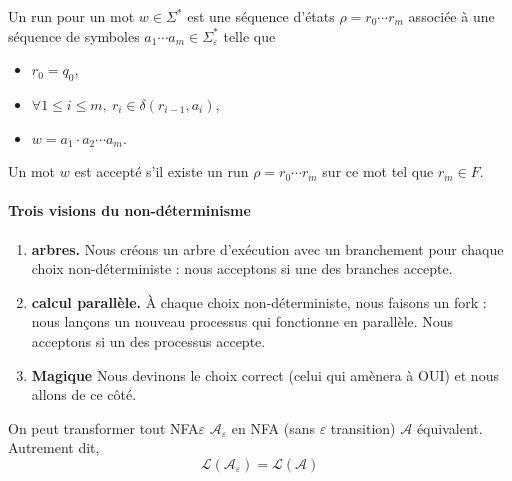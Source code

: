 \begin{definition}
Un run pour un mot $w \in \Sigma^*$ est une séquence d'états
$\rho = r_0 \cdots r_m$ associée à une séquence de symboles
$a_1 \cdots a_m \in \Sigma_\varepsilon^*$ telle que
\begin{itemize}
    \item $r_0 = q_0$,
    \item $\forall 1 \leq i \leq m,\ r_i \in \delta(r_{i-1}, a_i)$,
    \item $w = a_1 \cdot a_2 \cdots a_m$.
\end{itemize}
\end{definition}

\begin{definition}
Un mot $w$ est accepté s'il existe un run $\rho = r_0 \cdots r_m$ sur ce mot
tel que $r_m \in F$.
\end{definition}

\paragraph{Trois visions du non-déterminisme}

\begin{enumerate}
    \item \textbf{arbres.}
    Nous créons un arbre d'exécution avec un branchement pour chaque choix
    non-déterministe : nous acceptons si une des branches accepte.

    \item \textbf{calcul parallèle.}
    À chaque choix non-déterministe, nous faisons un \og fork \fg{} : nous lançons
    un nouveau processus qui fonctionne en parallèle. Nous acceptons si un des
    processus accepte.

    \item \textbf{Magique}
    Nous \og devinons \fg{} le choix correct (celui qui amènera à OUI) et nous
    allons de ce côté.
\end{enumerate}

\begin{proposition}
    On peut transformer tout NFA$\varepsilon$ $\mathcal{A}_\varepsilon$ en NFA (sans $\varepsilon$ transition) $\mathcal{A}$ équivalent. Autrement dit,
    $$\mathcal{L}(\mathcal{A}_\varepsilon)=\mathcal{L}(\mathcal{A})$$
\end{proposition}



